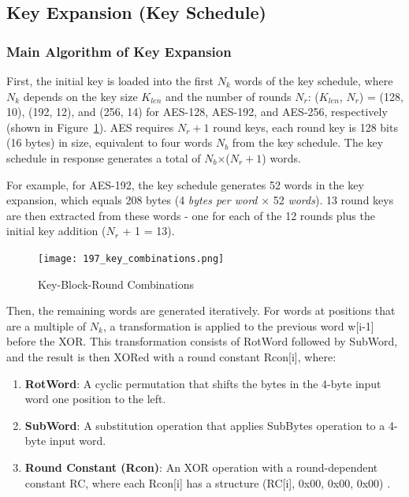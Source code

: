 \subsection{Key Expansion (Key Schedule)}



\subsubsection*{Main Algorithm of Key Expansion}
\label{sec:key-expansion}

First, the initial key is loaded into the first $N_k$ words of the key schedule, where $N_k$ depends 
on the key size $K_{len}$ and the number of rounds $N_r$: ($K_{len}$, $N_r$) = (128, 10), (192, 12), and (256, 14) 
for AES-128, AES-192, and AES-256, respectively \cite{Key_Collisions} (shown in Figure~\ref{fig:key_comb}). AES requires $N_r+1$ round keys, each round key is 
128 bits (16 bytes) in size, equivalent to four words $N_b$ from the key schedule. The key schedule in 
response generates a total of $N_b$×($N_r+1$) words\cite{NIST_AES}. \newline

For example, for AES-192, the key schedule generates 52 words in the key expansion, which equals 208 bytes (4 \textit{bytes per word} × 52 \textit{words}).
13 round keys are then extracted from these words - one for each of the 12 rounds plus the initial key addition ($N_r$ + 1 = 13).

\begin{figure}[h] %
    \centering
    \texttt{[image: 197\_key\_combinations.png]} %
    \caption{
        Key-Block-Round Combinations \cite{NIST_AES}
    }
    \label{fig:key_comb} %
\end{figure}

Then, the remaining words are generated iteratively. For words at positions that are a multiple of $N_k$, a 
transformation is applied to the previous word w[i-1] before the \Gls{XOR}. This transformation consists of RotWord 
followed by SubWord, and the result is then XORed with a round constant Rcon[i], where:

\begin{enumerate}
    \item \textbf{RotWord}: A cyclic permutation that shifts the bytes in the 4-byte input word one position to the left. 
    \item \textbf{SubWord}: A substitution operation that applies SubBytes operation to a 4-byte input word. 
    \item \textbf{Round Constant (Rcon)}:  An \Gls{XOR} operation with a round-dependent constant RC, where each Rcon[i]
    has a structure (RC[i], 0x00, 0x00, 0x00) \cite{NIST_AES}. 
\end{enumerate}

